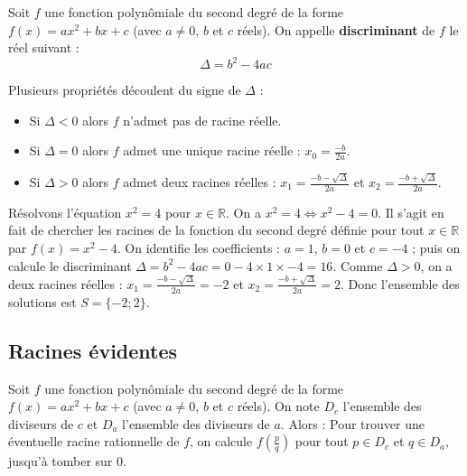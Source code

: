 	\begin{formula}[Définition]
		Soit $f$ une fonction polynômiale du second degré de la forme $f(x) = ax^2 + bx + c$ (avec $a \neq 0$, $b$ et $c$ réels). On appelle \textbf{discriminant} de $f$ le réel suivant :
		\[ \Delta = b^2 - 4ac \]
	\end{formula}

	\begin{formula}[Propriétés]
		Plusieurs propriétés découlent du signe de $\Delta$ :
		\begin{itemize}
			\item Si $\Delta < 0$ alors $f$ n'admet pas de racine réelle.
			\item Si $\Delta = 0$ alors $f$ admet une unique racine réelle : $x_0 = \frac{-b}{2a}$.
			\item Si $\Delta > 0$ alors $f$ admet deux racines réelles : $x_1 = \frac{-b - \sqrt{\Delta}}{2a}$ et $x_2 = \frac{-b + \sqrt{\Delta}}{2a}$.
		\end{itemize}
	\end{formula}

	\begin{tip}[Exemple]
		Résolvons l'équation $x^2 = 4$ pour $x \in \mathbb{R}$.
		\newpar
		On a $x^2 = 4 \iff x^2 - 4 = 0$. Il s'agit en fait de chercher les racines de la fonction du second degré définie pour tout $x \in \mathbb{R}$ par $f(x) = x^2 - 4$.
		\newline
		On identifie les coefficients : $a = 1$, $b = 0$ et $c = -4$ ; puis on calcule le discriminant $\Delta = b^2 - 4ac = 0 - 4 \times 1 \times -4 = 16$.
		\newpar
		Comme $\Delta > 0$, on a deux racines réelles :
		$x_1 = \frac{-b - \sqrt{\Delta}}{2a} = -2$ et $x_2 = \frac{-b + \sqrt{\Delta}}{2a} = 2$.
		\newpar
		Donc l'ensemble des solutions est $S = \{-2; 2\}$.
	\end{tip}

	\subsection{Racines évidentes}

	\begin{formula}
		Soit $f$ une fonction polynômiale du second degré de la forme $f(x) = ax^2 + bx +c$ (avec $a \neq 0$, $b$ et $c$ réels). On note $D_c$ l'ensemble des diviseurs de $c$ et $D_a$ l'ensemble des diviseurs de $a$. Alors :
		\newpar
		Pour trouver une éventuelle racine rationnelle de $f$, on calcule $f\left(\frac{p}{q}\right)$ pour tout $p \in D_c$ et $q \in D_a$, jusqu'à tomber sur $0$.
	\end{formula}

